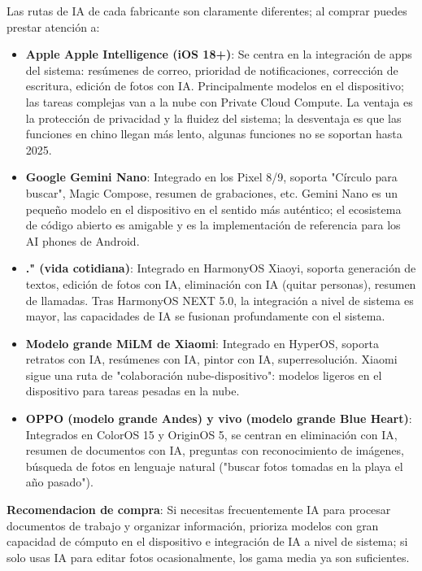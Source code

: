 
Las rutas de IA de cada fabricante son claramente diferentes; al comprar puedes prestar atención a:

\begin{itemize}
  \item \textbf{Apple Apple Intelligence (iOS 18+)}: Se centra en la integración de apps del sistema: resúmenes de correo, prioridad de notificaciones, corrección de escritura, edición de fotos con IA. Principalmente modelos en el dispositivo; las tareas complejas van a la nube con Private Cloud Compute. La ventaja es la protección de privacidad y la fluidez del sistema; la desventaja es que las funciones en chino llegan más lento, algunas funciones no se soportan hasta 2025.
  \item \textbf{Google Gemini Nano}: Integrado en los Pixel 8/9, soporta "Círculo para buscar", Magic Compose, resumen de grabaciones, etc. Gemini Nano es un pequeño modelo en el dispositivo en el sentido más auténtico; el ecosistema de código abierto es amigable y es la implementación de referencia para los AI phones de Android.
  \item \textbf{." (vida cotidiana)}: Integrado en HarmonyOS Xiaoyi, soporta generación de textos, edición de fotos con IA, eliminación con IA (quitar personas), resumen de llamadas. Tras HarmonyOS NEXT 5.0, la integración a nivel de sistema es mayor, las capacidades de IA se fusionan profundamente con el sistema.
  \item \textbf{Modelo grande MiLM de Xiaomi}: Integrado en HyperOS, soporta retratos con IA, resúmenes con IA, pintor con IA, superresolución. Xiaomi sigue una ruta de "colaboración nube-dispositivo": modelos ligeros en el dispositivo para tareas pesadas en la nube.
  \item \textbf{OPPO (modelo grande Andes) y vivo (modelo grande Blue Heart)}: Integrados en ColorOS 15 y OriginOS 5, se centran en eliminación con IA, resumen de documentos con IA, preguntas con reconocimiento de imágenes, búsqueda de fotos en lenguaje natural ("buscar fotos tomadas en la playa el año pasado").
\end{itemize}

\textbf{Recomendacion de compra}: Si necesitas frecuentemente IA para procesar documentos de trabajo y organizar información, prioriza modelos con gran capacidad de cómputo en el dispositivo e integración de IA a nivel de sistema; si solo usas IA para editar fotos ocasionalmente, los gama media ya son suficientes.

